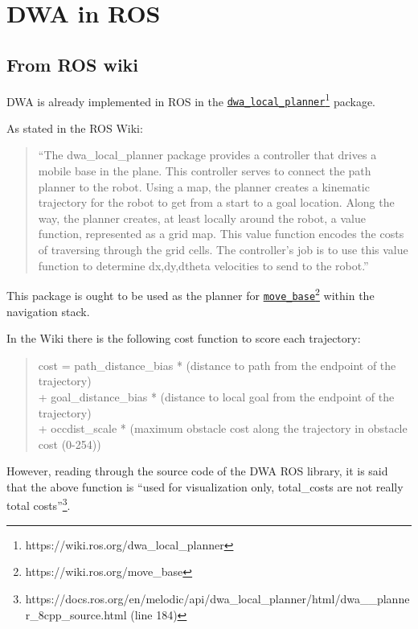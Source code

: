 \documentclass[11pt,a4paper]{article}
\begin{document}

\section{DWA in ROS}

\subsection{From ROS wiki}

DWA is already implemented in ROS in the \href{https://wiki.ros.org/dwa\_local\_planner}{\texttt{dwa\_local\_planner}}\footnote{https://wiki.ros.org/dwa\_local\_planner} package.

As stated in the ROS Wiki:
\begin{quote}
 ``The dwa\_local\_planner package provides a controller that drives a mobile base in the plane. This controller serves to connect the path planner to the robot. Using a map, the planner creates a kinematic trajectory for the robot to get from a start to a goal location. Along the way, the planner creates, at least locally around the robot, a value function, represented as a grid map. This value function encodes the costs of traversing through the grid cells. The controller's job is to use this value function to determine dx,dy,dtheta velocities to send to the robot.''
\end{quote}

This package is ought to be used as the planner for \href{https://wiki.ros.org/move\_base}{\texttt{move\_base}}\footnote{https://wiki.ros.org/move\_base} within the navigation stack.

In the Wiki there is the following cost function to score each trajectory:

\begin{quote}
    cost =
    path\_distance\_bias * (distance to path from the endpoint of the trajectory)\\
    + goal\_distance\_bias * (distance to local goal from the endpoint of the trajectory)\\
    + occdist\_scale * (maximum obstacle cost along the trajectory in obstacle cost (0-254))
\end{quote}

However, reading through the source code of the DWA ROS library, it is said that the above function is ``used for visualization only, total\_costs are not really total costs''\footnote{https://docs.ros.org/en/melodic/api/dwa\_local\_planner/html/dwa\_\_planner\_8cpp\_source.html (line 184)}.
\end{document}
